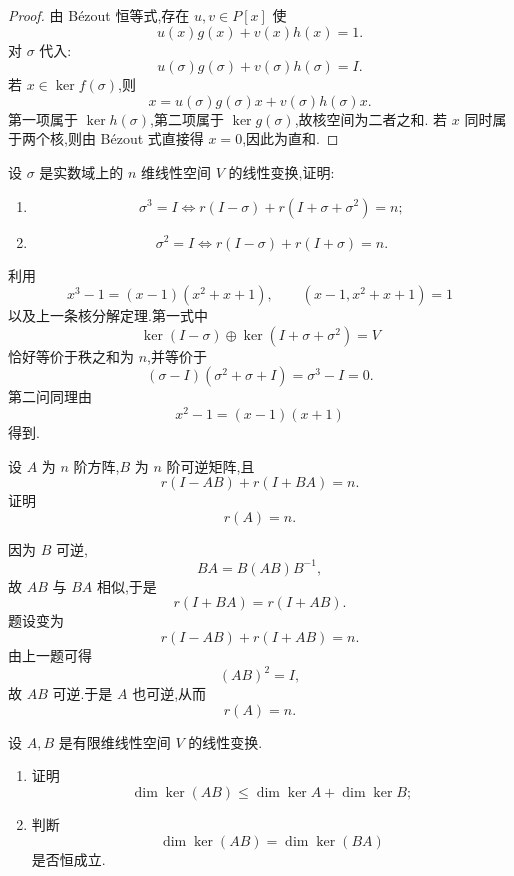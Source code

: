 \begin{proof}
由 Bézout 恒等式,存在 $u,v\in P[x]$ 使
\[
u(x)g(x)+v(x)h(x)=1.
\]
对 $\sigma$ 代入:
\[
u(\sigma)g(\sigma)+v(\sigma)h(\sigma)=I.
\]
若 $x\in\ker f(\sigma)$,则
\[
x=u(\sigma)g(\sigma)x+v(\sigma)h(\sigma)x.
\]
第一项属于 $\ker h(\sigma)$,第二项属于 $\ker g(\sigma)$,故核空间为二者之和.
若 $x$ 同时属于两个核,则由 Bézout 式直接得 $x=0$,因此为直和.
\end{proof}


\begin{example}
设 $\sigma$ 是实数域上的 $n$ 维线性空间 $V$ 的线性变换,证明:
\begin{enumerate}
    \item
    \[
    \sigma^3=I
    \iff
    r(I-\sigma)+r(I+\sigma+\sigma^2)=n;
    \]
    \item
    \[
    \sigma^2=I
    \iff
    r(I-\sigma)+r(I+\sigma)=n.
    \]
\end{enumerate}
\end{example}
\exampleblank

\begin{solution}
利用
\[
x^3-1=(x-1)(x^2+x+1),
\qquad
(x-1,x^2+x+1)=1
\]
以及上一条核分解定理.第一式中
\[
\ker(I-\sigma)\oplus\ker(I+\sigma+\sigma^2)=V
\]
恰好等价于秩之和为 $n$,并等价于
\[
(\sigma-I)(\sigma^2+\sigma+I)=\sigma^3-I=0.
\]
第二问同理由
\[
x^2-1=(x-1)(x+1)
\]
得到.
\end{solution}


\begin{example}
设 $A$ 为 $n$ 阶方阵,$B$ 为 $n$ 阶可逆矩阵,且
\[
r(I-AB)+r(I+BA)=n.
\]
证明
\[
r(A)=n.
\]
\end{example}
\exampleblank

\begin{solution}
因为 $B$ 可逆,
\[
BA=B(AB)B^{-1},
\]
故 $AB$ 与 $BA$ 相似,于是
\[
r(I+BA)=r(I+AB).
\]
题设变为
\[
r(I-AB)+r(I+AB)=n.
\]
由上一题可得
\[
(AB)^2=I,
\]
故 $AB$ 可逆.于是 $A$ 也可逆,从而
\[
\boxed{r(A)=n}.
\]
\end{solution}


\begin{example}
设 $A,B$ 是有限维线性空间 $V$ 的线性变换.
\begin{enumerate}
    \item 证明
    \[
    \dim\ker(AB)
    \leq
    \dim\ker A+\dim\ker B;
    \]
    \item 判断
    \[
    \dim\ker(AB)=\dim\ker(BA)
    \]
    是否恒成立.
\end{enumerate}
\end{example}
\exampleblank

